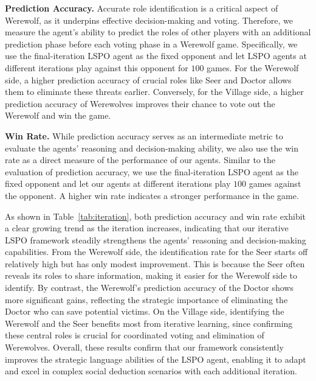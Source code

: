 \textbf{Prediction Accuracy.}
Accurate role identification is a critical aspect of Werewolf, as it underpins effective decision-making and voting. Therefore, we measure the agent’s ability to predict the roles of other players with an additional prediction phase before each voting phase in a Werewolf game. Specifically, we use the final-iteration LSPO agent as the fixed opponent and let LSPO agents at different iterations play against this opponent for $100$ games. For the Werewolf side, a higher prediction accuracy of crucial roles like Seer and Doctor allows them to eliminate these threats earlier. Conversely, for the Village side, a higher prediction accuracy of Werewolves improves their chance to vote out the Werewolf and win the game.

\textbf{Win Rate.}
While prediction accuracy serves as an intermediate metric to evaluate the agents' reasoning and decision-making ability, we also use the win rate as a direct measure of the performance of our agents. Similar to the evaluation of prediction accuracy, we use the final-iteration LSPO agent as the fixed opponent and let our agents at different iterations play $100$ games against the opponent. A higher win rate indicates a stronger performance in the game.

As shown in Table~\ref{tab:iteration}, both prediction accuracy and win rate exhibit a clear growing trend as the iteration increases, indicating that our iterative LSPO framework steadily strengthens the agents’ reasoning and decision-making capabilities. From the Werewolf side, the identification rate for the Seer starts off relatively high but has only modest improvement. This is because the Seer often reveals its roles to share information, making it easier for the Werewolf side to identify. By contrast, the Werewolf's prediction accuracy of the Doctor shows more significant gains, reflecting the strategic importance of eliminating the Doctor who can save potential victims. On the Village side, identifying the Werewolf and the Seer benefits most from iterative learning, since confirming these central roles is crucial for coordinated voting and elimination of Werewolves. Overall, these results confirm that our framework consistently improves the strategic language abilities of the LSPO agent, enabling it to adapt and excel in complex social deduction scenarios with each additional iteration.


